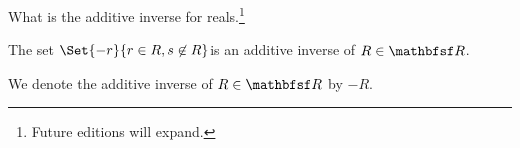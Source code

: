 

What is the additive inverse for reals.\footnote{Future editions will expand.}


\begin{proposition}
The set $\Set{-r}{r \in R, s \not\in R}$is an additive inverse of $R \in \R$.
\end{proposition}


We denote the additive inverse of $R \in \R$ by $-R$.

\blankpage
